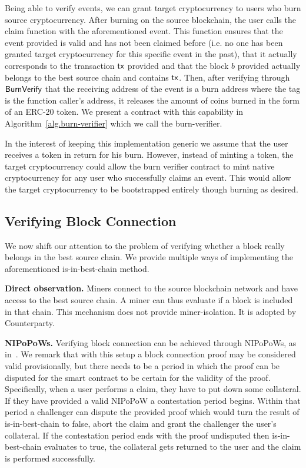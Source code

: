 Being able to verify events, we can grant target cryptocurrency to users who burn source cryptocurrency. After burning on the source blockchain, the user calls the \textsf{claim} function with the aforementioned event. This function ensures that the event provided is valid and has not been claimed before (i.e. no one has been granted target cryptocurrency for this specific event in the past), that it actually corresponds to the transaction $\textsf{tx}$ provided and that the block $b$ provided actually belongs to the best source chain and contains $\textsf{tx}$. Then, after verifying through $\mathsf{BurnVerify}$ that the receiving address of the event is a burn address where the tag is the function caller's address, it releases the amount of coins burned in the form of an ERC-20 token. We present a contract with this capability in Algorithm~\ref{alg.burn-verifier} which we call the \textsf{burn-verifier}.

In the interest of keeping this implementation generic we assume that the user receives a token in return for his burn. However, instead of minting a token, the target cryptocurrency could allow the burn verifier contract to mint native cryptocurrency for any user who successfully claims an event. This would allow the target cryptocurrency to be bootstrapped entirely though burning as desired.

\subsection{Verifying Block Connection}\label{section:block-connection}
We now shift our attention to the problem of verifying whether a block really belongs in the best source chain. We provide multiple ways of implementing the aforementioned \textsf{is-in-best-chain} method.

\noindent
\textbf{Direct observation.}
Miners connect to the source blockchain network and have access to the best source chain. A miner can thus evaluate if a block is included in that chain. This mechanism does not provide miner-isolation. It is adopted by Counterparty.

\noindent
\textbf{NIPoPoWs.}
Verifying block connection can be achieved through NIPoPoWs, as in~\cite{pow-sidechains}.
We remark that with this setup a block connection proof may be considered valid provisionally, but there needs to be a period in which the proof can be disputed for the smart contract to be certain for the validity of the proof. Specifically, when a user performs a claim, they have to put down some collateral. If they have provided a valid NIPoPoW a contestation period begins. Within that period a challenger can dispute the provided proof which would turn the result of \textsf{is-in-best-chain} to false, abort the claim and grant the challenger the user's collateral. If the contestation period ends with the proof undisputed then \textsf{is-in-best-chain} evaluates to true, the collateral gets returned to the user and the claim is performed successfully.


